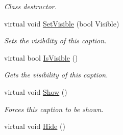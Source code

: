 \begin{DoxyCompactItemize}
\begin{DoxyCompactList}\small\item\em Class destructor. \item\end{DoxyCompactList}\item 
virtual void \hyperlink{classphys_1_1UI_1_1Caption_afce46e42eb3ab522c29d5c13a5691065}{SetVisible} (bool Visible)
\begin{DoxyCompactList}\small\item\em Sets the visibility of this caption. \item\end{DoxyCompactList}\item 
virtual bool \hyperlink{classphys_1_1UI_1_1Caption_a965d162160c26a2f9a2a16b88aa8f05d}{IsVisible} ()
\begin{DoxyCompactList}\small\item\em Gets the visibility of this caption. \item\end{DoxyCompactList}\item 
\hypertarget{classphys_1_1UI_1_1Caption_a9801eaaadf70f7373b410995b255936e}{
virtual void \hyperlink{classphys_1_1UI_1_1Caption_a9801eaaadf70f7373b410995b255936e}{Show} ()}
\label{d4/dfe/classphys_1_1UI_1_1Caption_a9801eaaadf70f7373b410995b255936e}

\begin{DoxyCompactList}\small\item\em Forces this caption to be shown. \item\end{DoxyCompactList}\item 
\hypertarget{classphys_1_1UI_1_1Caption_a12e772b19e723334747fcf2ca009965c}{
virtual void \hyperlink{classphys_1_1UI_1_1Caption_a12e772b19e723334747fcf2ca009965c}{Hide} ()}
\label{d4/dfe/classphys_1_1UI_1_1Caption_a12e772b19e723334747fcf2ca009965c}


\end{DoxyCompactItemize}
